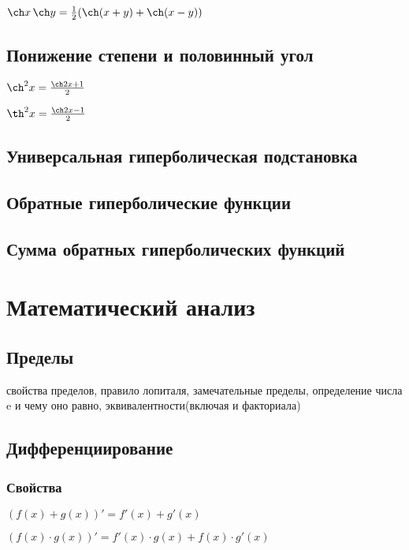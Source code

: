 $ \ch x \, \ch y = \frac12(\ch(x+y)+\ch(x-y)) $

\subsection{Понижение степени и половинный угол}

$ \ch^2 x = \frac{\ch 2x+1}{2} $

$ \th^2 x = \frac{\ch 2x-1}{2} $ 

\subsection{Универсальная гиперболическая подстановка}



\subsection{Обратные гиперболические функции}

\subsection{Сумма обратных гиперболических функций}


\section{Математический анализ}

\subsection{Пределы}

свойства пределов, правило лопиталя, замечательные пределы, определение числа e и чему оно равно, эквивалентности(включая и факториала)

\subsection{Дифференциирование}

\subsubsection{Свойства}

$ (f(x) + g(x))' = f'(x) + g'(x) $

$ (f(x)\cdot g(x))' = f'(x)\cdot g(x) + f(x)\cdot g'(x) $

